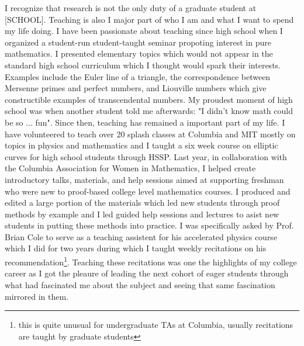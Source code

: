 \documentclass[11pt]{amsart}
\begin{document}
I recognize that research is not the only duty of a graduate student at [SCHOOL]. Teaching is also I major part of who I am and what I want to spend my life doing. I have been passionate about teaching since high school when I organized a student-run student-taught seminar propoting interest in pure mathematics. I presented elementary topics which would not appear in the standard high school curriculum which I thought would spark their interests. Examples include the Euler line of a triangle, the correspondence between Mersenne primes and perfect numbers, and Liouville numbers which give constructible examples of transcendental numbers. My proudest moment of high school was when another student told me afterwards: "I didn't know math could be so ... fun". Since then, teaching has remained a important part of my life. I have volunteered to teach over 20 splash classes at Columbia and MIT mostly on topics in physics and mathematics and I taught a six week course on elliptic curves for high school students through HSSP. Last year, in collaboration with the Columbia Association for Women in Mathematics, I helped create introductory talks, materials, and help sessions aimed at supporting freshman who were new to proof-based college level mathematics courses. I produced and edited a large portion of the materials which led new students through proof methods by example and I led guided help sessions and lectures to asist new students in putting these methods into practice. I was specifically asked by Prof. Brian Cole to serve as a teaching assistent for his accelerated physics course which I did for two years during which I taught weekly recitations on his recommendation\footnote{this is quite unusual for undergraduate TAs at Columbia, usually recitations are taught by graduate students}. Teaching these recitations was one the highlights of my college career as I got the pleaure of leading the next cohort of eager students through what had fascinated me about the subject and seeing that same fascination mirrored in them.   
\end{document}
